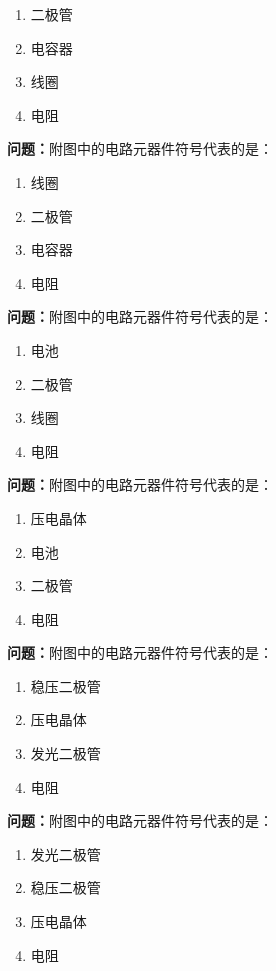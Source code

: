 \begin{enumerate}[label=\Alph*), leftmargin=3em]
\item 二极管
\item 电容器
\item 线圈
\item 电阻
\end{enumerate}%

\bigskip


\noindent\textbf{问题：}附图中的电路元器件符号代表的是：
\begin{enumerate}[label=\Alph*), leftmargin=3em]
\item 线圈
\item 二极管
\item 电容器
\item 电阻
\end{enumerate}

\bigskip


\noindent\textbf{问题：}附图中的电路元器件符号代表的是：
\begin{enumerate}[label=\Alph*), leftmargin=3em]
\item 电池
\item 二极管
\item 线圈
\item 电阻
\end{enumerate}

\bigskip


\noindent\textbf{问题：}附图中的电路元器件符号代表的是：
\begin{enumerate}[label=\Alph*), leftmargin=3em]
\item 压电晶体
\item 电池
\item 二极管
\item 电阻
\end{enumerate}

\bigskip


\noindent\textbf{问题：}附图中的电路元器件符号代表的是：
\begin{enumerate}[label=\Alph*), leftmargin=3em]
\item 稳压二极管
\item 压电晶体
\item 发光二极管
\item 电阻
\end{enumerate}

\bigskip


\noindent\textbf{问题：}附图中的电路元器件符号代表的是：
\begin{enumerate}[label=\Alph*), leftmargin=3em]
\item 发光二极管
\item 稳压二极管
\item 压电晶体
\item 电阻
\end{enumerate}

